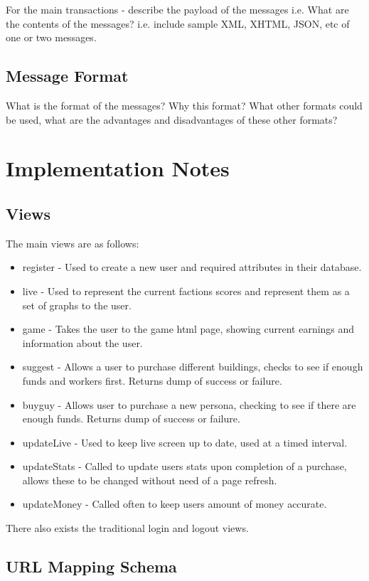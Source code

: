 \documentclass{sig-alt-release2}
\begin{document}
For the main transactions - describe the payload of the messages 
i.e. What are the contents of the messages? i.e. include sample XML, XHTML, JSON, etc of one or two messages.

\subsection{Message Format}

What is the format of the messages? 
Why this format? 
What other formats could be used, what are the advantages and disadvantages of these other formats?

\section{Implementation Notes}

\subsection{Views}

The main views are as follows:
\begin{itemize}
\item register - Used to create a new user and required attributes in their database.
\item live - Used to represent the current factions scores and represent them as a set of graphs to the user.
\item game - Takes the user to the game html page, showing current earnings and information about the user.
\item suggest - Allows a user to purchase different buildings, checks to see if enough funds and workers first. Returns dump of success or failure.
\item buyguy - Allows user to purchase a new persona, checking to see if there are enough funds. Returns dump of success or failure.
\item updateLive - Used to keep live screen up to date, used at a timed interval.
\item updateStats - Called to update users stats upon completion of a purchase, allows these to be changed without need of a page refresh.
\item updateMoney - Called often to keep users amount of money accurate.
\end{itemize}
There also exists the traditional login and logout views.
\subsection{URL Mapping Schema}
\end{document}
